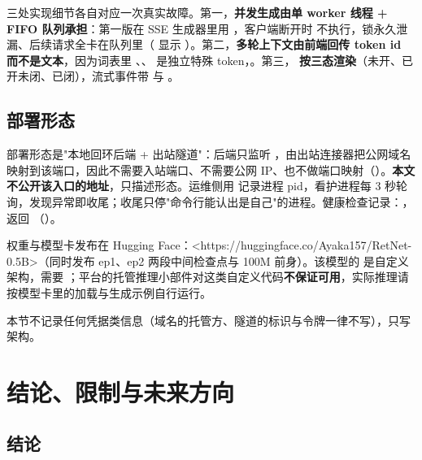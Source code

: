 \documentclass[11pt,openany]{ctexart}
\begin{document}
三处实现细节各自对应一次真实故障。第一，\textbf{并发生成由单 worker 线程 + FIFO 队列承担}：第一版在 SSE 生成器里用 ，客户端断开时  不执行，锁永久泄漏、后续请求全卡在队列里（ 显示 ）。第二，\textbf{多轮上下文由前端回传 token id 而不是文本}，因为词表里 \code{<}、\code{>}、\code{\allowbreak{}/} 是独立特殊 token，。第三，\textbf{ 按三态渲染}（未开、已开未闭、已闭），流式事件带  与 。

\subsection{部署形态}

部署形态是"本地回环后端 + 出站隧道"：后端只监听 ，由出站连接器把公网域名映射到该端口，因此不需要入站端口、不需要公网 IP、也不做端口映射（）。\textbf{本文不公开该入口的地址}，只描述形态。运维侧用  记录进程 pid，看护进程每 3 秒轮询，发现异常即收尾；收尾只停"命令行能认出是自己"的进程。健康检查记录：，返回 （）。

权重与模型卡发布在 Hugging Face：<https://huggingface.co/Ayaka157/RetNet-0.5B>（同时发布 ep1、ep2 两段中间检查点与 100M 前身）。该模型的  是自定义架构，需要 ；平台的托管推理小部件对这类自定义代码\textbf{不保证可用}，实际推理请按模型卡里的加载与生成示例自行运行。

本节不记录任何凭据类信息（域名的托管方、隧道的标识与令牌一律不写），只写架构。

\section{结论、限制与未来方向}

\subsection{结论}
\end{document}
